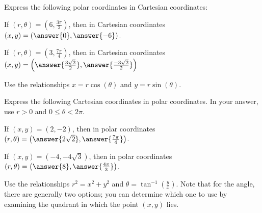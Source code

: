 \documentclass{ximera}
\author{Jim Talamo and Jason Miller}
\begin{document}
\begin{exercise}

Express the following polar coordinates in Cartesian coordinates: 

If $\left(r,\theta\right) = \left( 6, \frac{3\pi}{2}\right)$, then in Cartesian coordinates $(x,y) = \left( \answer{0}, \answer{-6 }\right)$.

If $\left(r,\theta\right) = \left(3, \frac{7 \pi}{4}\right)$, then in Cartesian coordinates $(x,y) = \left( \answer{\frac{3\sqrt{2}}{2}}, \answer{\frac{-3\sqrt{2}}{2}} \right)$

\begin{hint}
Use the relationships $x=r\cos(\theta)$ and $y=r\sin(\theta)$.
\end{hint}

\end{exercise}

\begin{exercise}

Express the following Cartesian coordinates in polar coordinates.  In your answer, use $r>0$ and $0 \leq \theta < 2\pi$. 


If $(x,y) =\left(2, -2 \right)$, then in polar coordinates $(r,\theta) =\left( \answer{ 2\sqrt{2}}, \answer{ \frac{7\pi}{4 } } \right)$. 

If $(x,y) =\left(-4, -4\sqrt{3} \right)$, then in polar coordinates $(r,\theta) =\left( \answer{ 8 } , \answer{  \frac{4\pi}{3}  } \right)$. 

\begin{hint}
Use the relationships $r^2=x^2+y^2$ and $\theta = \tan^{-1}\left(\frac{y}{x}\right)$.  Note that for the angle, there are generally two options; you can determine which one to use by examining the quadrant in which the point $(x,y)$ lies.

\end{hint}
\end{exercise}
\end{document}
